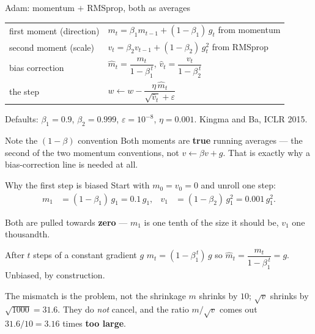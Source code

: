 \documentclass[aspectratio=169]{beamer}
\begin{document}
\begin{frame}[shrink=10]{Adam: momentum $+$ RMSprop, both as averages}
  \begin{center}
  \begin{tabular}{@{}ll@{}}
    \toprule
    first moment (direction) & $m_t = \beta_1 m_{t-1} + (1-\beta_1)\, g_t$
      \hfill{\small from momentum}\\[3pt]
    second moment (scale)    & $v_t = \beta_2 v_{t-1} + (1-\beta_2)\, g_t^2$
      \hfill{\small from RMSprop}\\[6pt]
    bias correction          & $\hat m_t = \dfrac{m_t}{1-\beta_1^{\,t}}$,
      \qquad $\hat v_t = \dfrac{v_t}{1-\beta_2^{\,t}}$\\[8pt]
    the step                 & $w \leftarrow w - \dfrac{\eta\, \hat m_t}
                                {\sqrt{\hat v_t}+\varepsilon}$\\
    \bottomrule
  \end{tabular}
  \end{center}
  \vspace{0.5em}
  \begin{center}\small
    Defaults: $\beta_1 = 0.9$, $\beta_2 = 0.999$, $\varepsilon = 10^{-8}$,
    $\eta = 0.001$. Kingma and Ba, ICLR 2015.
  \end{center}
  \vspace{0.3em}
  \begin{alertblock}{Note the $(1-\beta)$ convention}
    Both moments are \textbf{true} running averages --- the second of the two
    momentum conventions, not $v \leftarrow \beta v + g$. That is exactly why a
    bias-correction line is needed at all.
  \end{alertblock}
\end{frame}

\begin{frame}[shrink=6]{Why the first step is biased}
  Start with $m_0 = v_0 = 0$ and unroll one step:
  \begin{align*}
    m_1 &= (1-\beta_1)\,g_1 = 0.1\, g_1, &
    v_1 &= (1-\beta_2)\, g_1^2 = 0.001\, g_1^2 .
  \end{align*}
  \begin{center}
    Both are pulled towards \textbf{zero} --- $m_1$ is one tenth of the size it
    should be, $v_1$ one thousandth.
  \end{center}
  \vspace{0.4em}
  \begin{exampleblock}{After $t$ steps of a constant gradient $g$}
    \centering
    $m_t = (1-\beta_1^{\,t})\, g$ \qquad so \qquad
    $\hat m_t = \dfrac{m_t}{1-\beta_1^{\,t}} = g$. \quad Unbiased, by
    construction.
  \end{exampleblock}
  \vspace{0.4em}
  \begin{alertblock}{The mismatch is the problem, not the shrinkage}
    \small $m$ shrinks by $10$; $\sqrt{v}$ shrinks by $\sqrt{1000} = 31.6$. They
    do \emph{not} cancel, and the ratio $m/\sqrt{v}$ comes out $31.6/10 = 3.16$
    times \textbf{too large}.
  \end{alertblock}
\end{frame}
\end{document}
